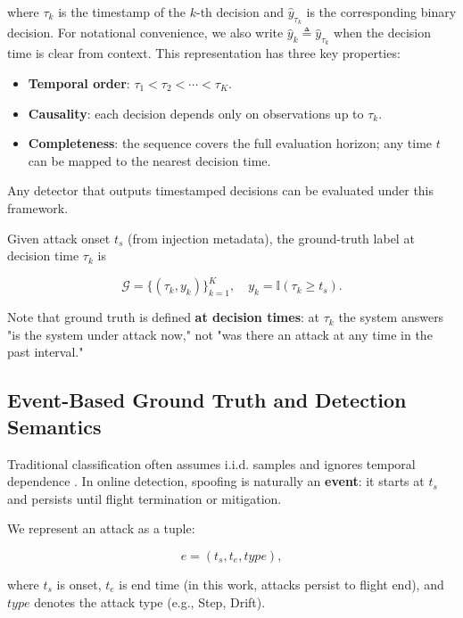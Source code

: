 \documentclass{ieeeaccess}
\begin{document}
where \(\tau_k\) is the timestamp of the \(k\)-th decision and \(\hat{y}_{\tau_k}\) is the corresponding binary decision. For notational convenience, we also write \(\hat{y}_k\triangleq \hat{y}_{\tau_k}\) when the decision time is clear from context. This representation has three key properties:

\begin{itemize}
\item \textbf{Temporal order}: \(\tau_1 < \tau_2 < \cdots < \tau_K\).
\item \textbf{Causality}: each decision depends only on observations up to \(\tau_k\).
\item \textbf{Completeness}: the sequence covers the full evaluation horizon; any time \(t\) can be mapped to the nearest decision time.
\end{itemize}

Any detector that outputs timestamped decisions can be evaluated under this framework.

Given attack onset \(t_s\) (from injection metadata), the ground-truth label at decision time \(\tau_k\) is

\begin{equation}
\mathcal{G} = \{(\tau_k, y_k)\}_{k=1}^K, \quad y_k = \mathbb{I}(\tau_k \ge t_s).
\end{equation}

Note that ground truth is defined \textbf{at decision times}: at \(\tau_k\) the system answers "is the system under attack now," not "was there an attack at any time in the past interval."

\subsection{Event-Based Ground Truth and Detection Semantics}

Traditional classification often assumes i.i.d. samples and ignores temporal dependence \cite{ref21}. In online detection, spoofing is naturally an \textbf{event}: it starts at \(t_s\) and persists until flight termination or mitigation.

We represent an attack as a tuple:

\begin{equation}
 e = (t_s, t_e, type),
\end{equation}

where \(t_s\) is onset, \(t_e\) is end time (in this work, attacks persist to flight end), and \(type\) denotes the attack type (e.g., Step, Drift).
\end{document}

